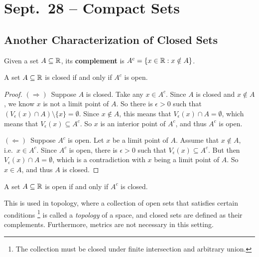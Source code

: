 \chapter{Sept.~28 -- Compact Sets}

\section{Another Characterization of Closed Sets}
\begin{definition}
  Given a set $A \subseteq \mathbb{R}$, its \textbf{complement} is
  $A^c = \{x \in \mathbb{R} : x \notin A\}$.
\end{definition}

\begin{theorem}
  A set $A \subseteq \mathbb{R}$ is closed if and only if $A^c$
  is open.
\end{theorem}

\begin{proof}
  $(\Rightarrow)$\, Suppose $A$ is closed. Take any $x \in A^c$.
  Since $A$ is closed and $x \notin A$, we know $x$ is not a
  limit point of $A$. So there is $\epsilon > 0$ such that
  $(V_\epsilon(x) \cap A) \setminus \{x\} = \emptyset$.
  Since $x \notin A$, this means that
  $V_\epsilon(x) \cap A = \emptyset$, which means that
  $V_\epsilon(x) \subseteq A^c$. So $x$ is an interior point
  of $A^c$, and thus $A^c$ is open.

  $(\Leftarrow)$\, Suppose $A^c$ is open. Let $x$ be a
  limit point of $A$. Assume that $x \notin A$, i.e.~$x \in A^c$.
  Since $A^c$ is open, there is $\epsilon > 0$ such that
  $V_\epsilon(x) \subseteq A^c$. But then
  $V_\epsilon(x) \cap A = \emptyset$, which is a contradiction
  with $x$ being a limit point of $A$. So $x \in A$, and
  thus $A$ is closed.
\end{proof}

\begin{corollary}
  A set $A \subseteq \mathbb{R}$ is open if and only if $A^c$
  is closed.
\end{corollary}

\begin{remark}
  This is used in topology, where a collection of open sets
  that satisfies certain conditions
  \footnote{The collection must be closed under finite intersection and arbitrary union.}
  is called a \textit{topology}
  of a space, and closed sets are defined as their complements.
  Furthermore, metrics are not necessary in this setting.
\end{remark}


